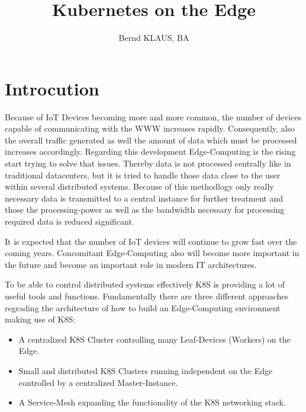 \documentclass[MSC,Master,english]{twbook}%
\title{Kubernetes on the Edge}
\author{Bernd KLAUS, BA}
\begin{document}
\maketitle

\chapter{Introcution}
\label{chap:introduction}
Because of \ac{IoT} Devices becoming more and more common, the number of devices capable of communicating with the \ac{WWW} increases rapidly. Consequently, also the overall traffic generated as well the amount of data which must be processed increases accordingly. Regarding this development Edge-Computing is the rising start trying to solve that issues. Thereby data is not processed centrally like in traditional datacenters, but it is tried to handle those data close to the user within several distributed systems. Because of this methodlogy only really necessary data is transmitted to a central instance for further treatment and those the processing-power as well as the bandwidth necessary for processing required data is reduced significant. \par It is expected that the number of IoT devices will continue to grow fast\cite{SotE21} over the coming years. Concomitant Edge-Computing also will become more important in the future and become an important role in modern \ac{IT} architectures. \par To be able to control distributed systems effectively \ac{K8S} is providing a lot of useful tools and functions. Fundamentally there are three different approaches regrading the architecture of how to build an Edge-Computing environment making use of \ac{K8S}:

\begin{itemize}
    \label{item:architecture}
    \item A centralized \ac{K8S} Cluster controlling many Leaf-Devices (Workers) on the Edge.
    \item Small and distributed \ac{K8S} Clusters running independent on the Edge controlled by a
    centralized Master-Instance.
    \item A Service-Mesh expanding the functionality of the \ac{K8S} networking stack.
\end{itemize}
\end{document}

